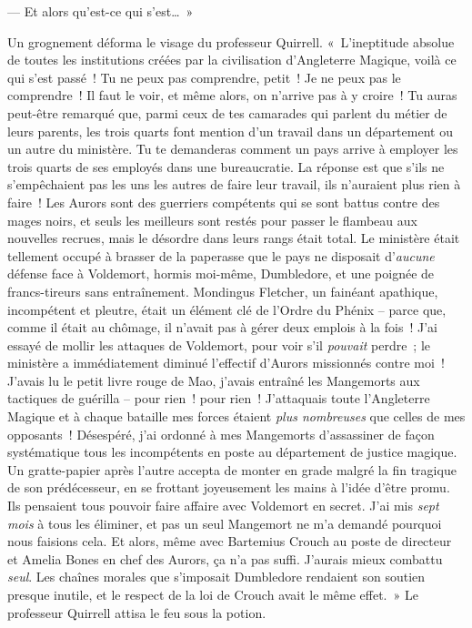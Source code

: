 --- Et alors qu'est-ce qui s'est…~»

Un grognement déforma le visage du professeur Quirrell.
«~L'ineptitude absolue de toutes les institutions créées par la civilisation d'Angleterre Magique, voilà ce qui s'est passé~!
Tu ne peux pas comprendre, petit~!
Je ne peux pas le comprendre~!
Il faut le voir, et même alors, on n'arrive pas à y croire~!
Tu auras peut-être remarqué que, parmi ceux de tes camarades qui parlent du métier de leurs parents, les trois quarts font mention d'un travail dans un département ou un autre du ministère.
Tu te demanderas comment un pays arrive à employer les trois quarts de ses employés dans une bureaucratie.
La réponse est que s'ils ne s'empêchaient pas les uns les autres de faire leur travail, ils n'auraient plus rien à faire~!
Les Aurors sont des guerriers compétents qui se sont battus contre des mages noirs, et seuls les meilleurs sont restés pour passer le flambeau aux nouvelles recrues, mais le désordre dans leurs rangs était total.
Le ministère était tellement occupé à brasser de la paperasse que le pays ne disposait d'\emph{aucune} défense face à Voldemort, hormis moi-même, Dumbledore, et une poignée de francs-tireurs sans entraînement.
Mondingus Fletcher, un fainéant apathique, incompétent et pleutre, était un élément clé de l'Ordre du Phénix -- parce que, comme il était au chômage, il n'avait pas à gérer deux emplois à la fois~!
J'ai essayé de mollir les attaques de Voldemort, pour voir s'il \emph{pouvait} perdre~; le ministère a immédiatement diminué l'effectif d'Aurors missionnés contre moi~!
J'avais lu le petit livre rouge de Mao, j'avais entraîné les Mangemorts aux tactiques de guérilla -- pour rien~! pour rien~!
J'attaquais toute l'Angleterre Magique et à chaque bataille mes forces étaient \emph{plus nombreuses} que celles de mes opposants~!
Désespéré, j'ai ordonné à mes Mangemorts d'assassiner de façon systématique tous les incompétents en poste au département de justice magique.
Un gratte-papier après l'autre accepta de monter en grade malgré la fin tragique de son prédécesseur, en se frottant joyeusement les mains à l'idée d'être promu.
Ils pensaient tous pouvoir faire affaire avec Voldemort en secret.
J'ai mis \emph{sept mois} à tous les éliminer, et pas un seul Mangemort ne m'a demandé pourquoi nous faisions cela.
Et alors, même avec Bartemius Crouch au poste de directeur et Amelia Bones en chef des Aurors, ça n'a pas suffi.
J'aurais mieux combattu \emph{seul}.
Les chaînes morales que s'imposait Dumbledore rendaient son soutien presque inutile, et le respect de la loi de Crouch avait le même effet.~»
Le professeur Quirrell attisa le feu sous la potion.

